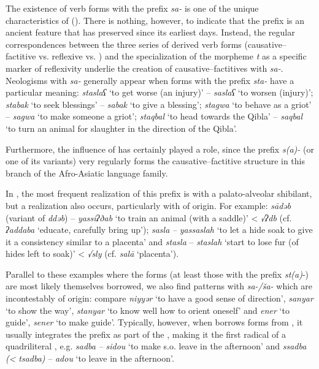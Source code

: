 \documentclass[output=paper]{langsci/langscibook}
\begin{document}
\label{sa}

The existence of verb forms with the prefix \textit{sa-} is one of the unique characteristics of  (\citealt{Cohen1963,Taine-Cheikh2003}). There is nothing, however, to indicate that the prefix is an ancient  feature that  has preserved since its earliest days. Instead, the regular correspondences between the three series of derived verb forms (causative--factitive vs. reflexive vs. ) and the specialization of the morpheme \textit{t} as a specific marker of reflexivity underlie the creation of causative--factitives with \textit{sa-}. Neologisms with \textit{sa-} generally appear when forms with the prefix \textit{sta-} have a particular meaning: \textit{staslaʕ} ‘to get worse (an injury)’ – \textit{saslaʕ} ‘to worsen (injury)’; \textit{stab{\R}ak} ‘to seek blessings’ – \textit{sab{\R}ak} ‘to give a blessing’; \textit{stagwa} ‘to behave as a griot’ – \textit{sagwa} ‘to make someone a griot’; \textit{staqbal} ‘to head towards the Qibla’ – \textit{saqbal} ‘to turn an animal for slaughter in the direction of the Qibla’. 

Furthermore, the influence of  has certainly played a role, since the prefix \textit{s(a)-} (or one of its variants) very regularly forms the causative--factitive structure in this branch of the Afro-Asiatic language family. 

In , the most frequent realization of this prefix is with a palato-alveolar shibilant, but a  realization also occurs, particularly with  of  origin. For example:  \textit{sādəb} (variant of \textit{ddəb}) –  \textit{yassiʔðab} ‘to train an animal (with a saddle)’ <  \textit{√ʔdb} (cf. \textit{ʔaddaba} ‘educate, carefully bring up’);  \textit{sasla} \textit{–}  \textit{yassaslah} ‘to let a hide soak to give it a consistency similar to a placenta’ and  \textit{stasla} –  \textit{staslah} ‘start to lose fur (of hides left to soak)’ <  \textit{√sly} (cf. \textit{salā} ‘placenta’).

Parallel to these examples where the  forms (at least those with the prefix \textit{st(a)}{}-) are most likely themselves borrowed, we also find patterns with \textit{sa-/ša-} which are incontestably of  origin: compare  \textit{niyyər} ‘to have a good sense of direction’, \textit{sanyar} ‘to show the way’, \textit{stanyar} ‘to know well how to orient oneself’ and  \textit{ener} ‘to guide’, \textit{sener} ‘to make guide’. Typically, however, when  borrows  forms from , it usually integrates the  prefix as part of the  , making it the first radical of a quadriliteral , e.g.  \textit{sadba} \textit{–}  \textit{sidou} ‘to make s.o. leave in the afternoon’ and  \textit{ssadba} \textit{(<} \textit{tsadba)} –  \textit{adou} ‘to leave in the afternoon’. 
\end{document}
